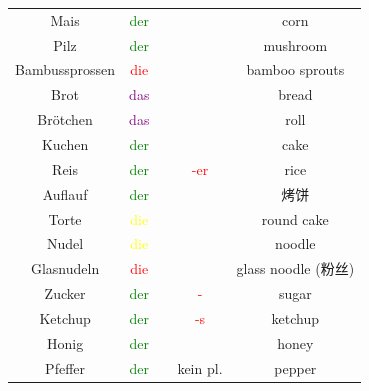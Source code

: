 \begin{center}
\begin{longtable} {|c|c|c|c|c|}
        Mais                  & \textcolor{green}{der}  &          &                                         & corn                   \\
        Pilz                  & \textcolor{green}{der}  &          &                                         & mushroom               \\
        Bambussprossen        & \textcolor{red}{die}    &          &                                         & bamboo sprouts         \\
        \hline
        Brot                  & \textcolor{purple}{das} &          &                                         & bread                  \\
        Brötchen              & \textcolor{purple}{das} &          &                                         & roll                   \\
        Kuchen                & \textcolor{green}{der}  &          &                                         & cake                   \\
        Reis                  & \textcolor{green}{der}  &          & \textcolor{red}{-er}                    & rice                   \\
        Auflauf               & \textcolor{green}{der}  &          &                                         & 烤饼                     \\
        Torte                 & \textcolor{yellow}{die} &          &                                         & round cake             \\
        Nudel                 & \textcolor{yellow}{die} &          &                                         & noodle                 \\
        Glasnudeln            & \textcolor{red}{die}    &          &                                         & glass noodle (粉丝)      \\
        \hline
        Zucker                & \textcolor{green}{der}  &          & \textcolor{red}{-}                      & sugar                  \\
        Ketchup               & \textcolor{green}{der}  &          & \textcolor{red}{-s}                     & ketchup                \\
        Honig                 & \textcolor{green}{der}  &          &                                         & honey                  \\
        Pfeffer               & \textcolor{green}{der}  &          & kein pl.                                & pepper                 \\

\end{longtable}
\end{center}
